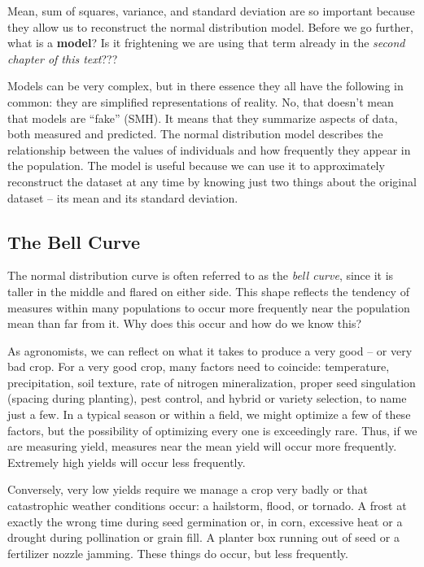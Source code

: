 \documentclass[
]{book}
\begin{document}
Mean, sum of squares, variance, and standard deviation are so important because they allow us to reconstruct the normal distribution model. Before we go further, what is a \textbf{model}? Is it frightening we are using that term already in the \emph{second chapter of this text}???

Models can be very complex, but in there essence they all have the following in common: they are simplified representations of reality. No, that doesn't mean that models are ``fake'' (SMH). It means that they summarize aspects of data, both measured and predicted. The normal distribution model describes the relationship between the values of individuals and how frequently they appear in the population. The model is useful because we can use it to approximately reconstruct the dataset at any time by knowing just two things about the original dataset -- its mean and its standard deviation.

\hypertarget{the-bell-curve}{%
\subsection{The Bell Curve}\label{the-bell-curve}}

The normal distribution curve is often referred to as the \emph{bell curve}, since it is taller in the middle and flared on either side. This shape reflects the tendency of measures within many populations to occur more frequently near the population mean than far from it. Why does this occur and how do we know this?

As agronomists, we can reflect on what it takes to produce a very good -- or very bad crop. For a very good crop, many factors need to coincide: temperature, precipitation, soil texture, rate of nitrogen mineralization, proper seed singulation (spacing during planting), pest control, and hybrid or variety selection, to name just a few. In a typical season or within a field, we might optimize a few of these factors, but the possibility of optimizing every one is exceedingly rare. Thus, if we are measuring yield, measures near the mean yield will occur more frequently. Extremely high yields will occur less frequently.

Conversely, very low yields require we manage a crop very badly or that catastrophic weather conditions occur: a hailstorm, flood, or tornado. A frost at exactly the wrong time during seed germination or, in corn, excessive heat or a drought during pollination or grain fill. A planter box running out of seed or a fertilizer nozzle jamming. These things do occur, but less frequently.
\end{document}
